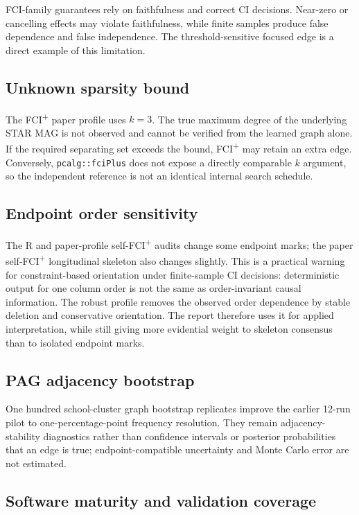 \documentclass[11pt,a4paper,oneside]{report}
\newcommand{\FCIplus}{FCI\textsuperscript{+}}
\newcommand{\code}[1]{\texttt{#1}}
\begin{document}
FCI-family guarantees rely on faithfulness and correct CI decisions. Near-zero
or cancelling effects may violate faithfulness, while finite samples produce
false dependence and false independence. The threshold-sensitive focused edge
is a direct example of this limitation.

\subsection{Unknown sparsity bound}

The \FCIplus{} paper profile uses \(k=3\). The true maximum degree of the
underlying STAR MAG is not observed and cannot be verified from the learned
graph alone. If the required separating set exceeds the bound, \FCIplus{} may
retain an extra edge. Conversely, \code{pcalg::fciPlus} does not expose a
directly comparable \(k\) argument, so the independent reference is not an
identical internal search schedule.

\subsection{Endpoint order sensitivity}

The R and paper-profile self-\FCIplus{} audits change some endpoint marks; the
paper self-\FCIplus{} longitudinal skeleton also changes slightly. This is a
practical warning for constraint-based orientation under finite-sample CI
decisions: deterministic output for one column order is not the same as
order-invariant causal information. The robust profile removes the observed
order dependence by stable deletion and conservative orientation. The report
therefore uses it for applied interpretation, while still giving more
evidential weight to skeleton consensus than to isolated endpoint marks.

\subsection{PAG adjacency bootstrap}

One hundred school-cluster graph bootstrap replicates improve the earlier
12-run pilot to one-percentage-point frequency resolution. They remain
adjacency-stability diagnostics rather than confidence intervals or posterior
probabilities that an edge is true; endpoint-compatible uncertainty and Monte
Carlo error are not estimated.

\subsection{Software maturity and validation coverage}
\end{document}
